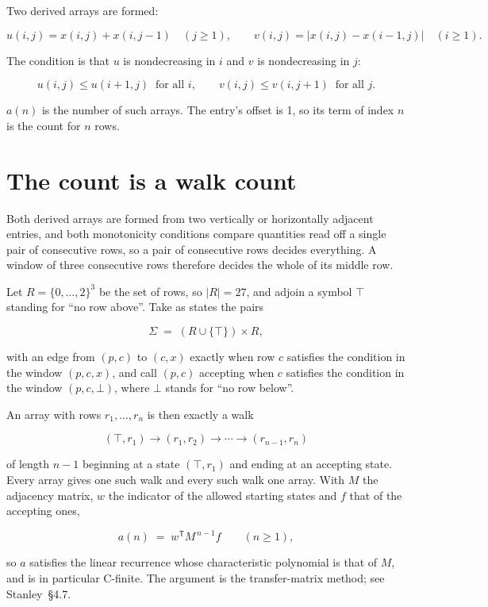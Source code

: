\documentclass[11pt]{article}
\theoremstyle{definition}
\begin{document}
Two derived arrays are formed:

\[u(i,j) = x(i,j) + x(i,j{-}1)\quad (j \ge 1), \qquad v(i,j) = \lvert x(i,j) - x(i{-}1,j)\rvert\quad (i \ge 1).\]

The condition is that $u$ is nondecreasing in $i$ and $v$ is nondecreasing in $j$:

\[u(i,j) \le u(i{+}1,j) \ \text{ for all } i, \qquad v(i,j) \le v(i,j{+}1) \ \text{ for all } j.\]

$a(n)$ is the number of such arrays. The entry's offset is 1, so its term of index $n$ is the count for $n$ rows.

\section{The count is a walk count}

Both derived arrays are formed from two vertically or horizontally adjacent entries, and both monotonicity conditions compare quantities read off a single pair of consecutive rows, so a pair of consecutive rows decides everything. A window of three consecutive rows therefore decides the whole of its middle row.

Let $R = \{0,\dots,2\}^{3}$ be the set of rows, so $|R| = 27$, and adjoin a symbol $\top$ standing for ``no row above''. Take as states the pairs

\[\Sigma \;=\; (R \cup \{\top\}) \times R,\]

with an edge from $(p,c)$ to $(c,x)$ exactly when row $c$ satisfies the condition in the window $(p,c,x)$, and call $(p,c)$ accepting when $c$ satisfies the condition in the window $(p,c,\bot)$, where $\bot$ stands for ``no row below''.

An array with rows $r_1,\dots,r_n$ is then exactly a walk

\[(\top,r_1) \to (r_1,r_2) \to \cdots \to (r_{n-1},r_n)\]

of length $n-1$ beginning at a state $(\top,r_1)$ and ending at an accepting state. Every array gives one such walk and every such walk one array. With $M$ the adjacency matrix, $w$ the indicator of the allowed starting states and $f$ that of the accepting ones,

\[a(n) \;=\; w^{\mathsf T} M^{\,n-1} f \qquad (n \ge 1),\]

so $a$ satisfies the linear recurrence whose characteristic polynomial is that of $M$, and is in particular C-finite. The argument is the transfer-matrix method; see Stanley~\S4.7.
\end{document}
